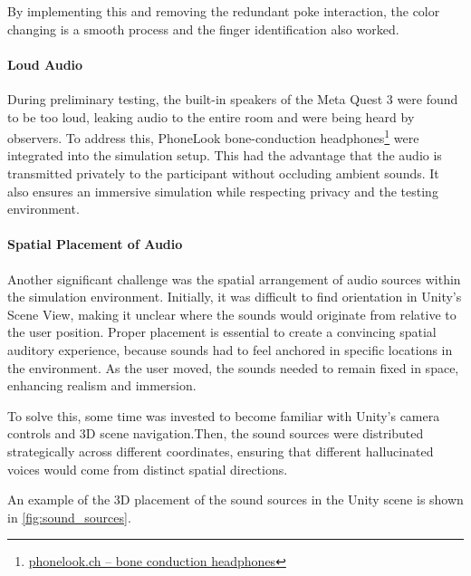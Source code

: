 By implementing this and removing the redundant poke interaction, the color changing is a smooth process and the finger identification also worked.

\paragraph{Loud Audio} 
During preliminary testing, the built-in speakers of the Meta Quest 3 were found to be too loud, leaking audio to the entire room and were being heard by observers. To address this, PhoneLook bone-conduction headphones\footnote{\href{https://www.phonelook.ch/de/stylische-kabellose-bluetooth-knochenleitungs-kopfhorer-fur-sport-laufen-radfahren-fitness-schwarz.html}{phonelook.ch – bone conduction headphones}} were integrated into the simulation setup. This had the advantage that the audio is transmitted privately to the participant without occluding ambient sounds.
It also ensures an immersive simulation while respecting privacy and the testing environment.

\paragraph{Spatial Placement of Audio} 
Another significant challenge was the spatial arrangement of audio sources within the simulation environment. Initially, it was difficult to find orientation in Unity's Scene View, making it unclear where the sounds would originate from relative to the user position. Proper placement is essential to create a convincing spatial auditory experience, because sounds had to feel anchored in specific locations in the environment. As the user moved, the sounds needed to remain fixed in space, enhancing realism and immersion.

\vspace{1em}

To solve this, some time was invested to become familiar with Unity's camera controls and 3D scene navigation.Then, the sound sources were distributed strategically across different coordinates, ensuring that different hallucinated voices would come from distinct spatial directions.

\vspace{1em}

An example of the 3D placement of the sound sources in the Unity scene is shown in \autoref{fig:sound_sources}.

